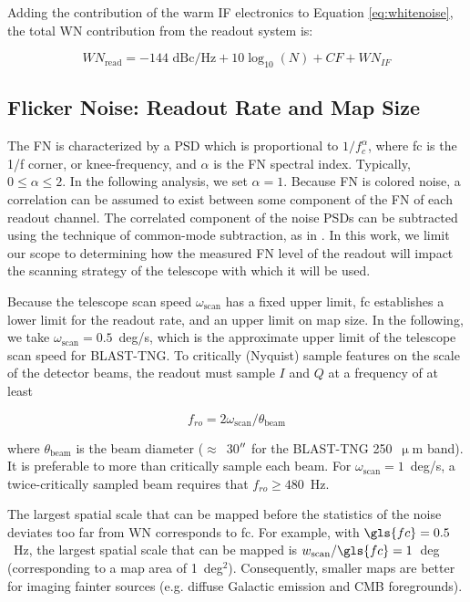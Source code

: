 Adding the contribution of the warm IF electronics to Equation \ref{eq:whitenoise}, the total WN contribution from the readout system is:

\begin{equation}\label{eq:readout_noise}
  WN_{\mathrm{read}} = -144 \textrm{ dBc/Hz} + 10\log_{10}(N) + CF + WN_{IF}
\end{equation}

\subsection{Flicker Noise: Readout Rate and Map Size}\label{flicker noise}

The FN is characterized by a PSD which is proportional to $1/f_{c}^{\alpha}$, where \gls{fc} is the 1/f corner, or knee-frequency, and $\alpha$ is the FN spectral index. Typically, $0 \leq \alpha \leq 2$. In the following analysis, we set $\alpha = 1$. Because FN is colored noise, a correlation can be assumed to exist between some component of the FN of each readout channel. The correlated component of the noise PSDs can be subtracted using the technique of common-mode subtraction, as in \citet{van2016multiplexed}. In this work, we limit our scope to determining how the measured FN level of the readout will impact the scanning strategy of the telescope with which it will be used.

Because the telescope scan speed $\omega_{\mathrm{scan}}$ has a fixed upper limit, \gls{fc} establishes a lower limit for the readout rate, and an upper limit on map size. In the following, we take $\omega_{\mathrm{scan}} = 0.5$~deg/s, which is the approximate upper limit of the telescope scan speed for BLAST-TNG. To critically (Nyquist) sample features on the scale of the detector beams, the readout must sample $I$ and $Q$ at a frequency of at least

\begin{equation}\label{eq:readout rate}
  f_{ro} = 2 \omega_{\mathrm{scan}} / \theta_{\mathrm{beam}}
\end{equation}

where $\theta_{\mathrm{beam}}$ is the beam diameter ($\approx$~30$\operatorname{^{\prime\prime}}$ for the BLAST-TNG 250~$\upmu$m band). It is preferable to more than critically sample each beam. For $\omega_{\mathrm{scan}} = 1$~deg/s, a twice-critically sampled beam requires that $f_{ro} \geq 480$~Hz.

The largest spatial scale that can be mapped before the statistics of the noise deviates too far from WN corresponds to \gls{fc}. For example, with $\gls{fc} = 0.5$~Hz, the largest spatial scale that can be mapped is $w_{\mathrm{scan}} / \gls{fc} = 1$~deg (corresponding to a map area of 1~deg$^{2}$). Consequently, smaller maps are better for imaging fainter sources (e.g. diffuse Galactic emission and CMB foregrounds).

